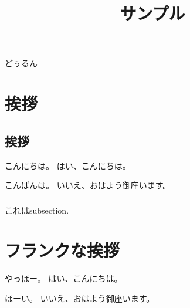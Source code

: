\documentclass[a4paper,11pt,oneside,openany,report]{jsbook}
\title{サンプル}
\begin{document}
\maketitle
\href{https://twitter.com/NegiIgaiNuki}{どぅるん}

\chapter{挨拶}\label{ch:挨拶}
\section{挨拶}\label{sec:挨拶/挨拶}
こんにちは。
はい、こんにちは。

こんばんは。
いいえ、おはよう御座います。

\subsection{}\label{subsec:挨拶/挨拶/-1150714728}
これはsubsection.

\chapter{フランクな挨拶}\label{ch:フランクな挨拶}
やっほー。
はい、こんにちは。

ほーい。
いいえ、おはよう御座います。
\end{document}

